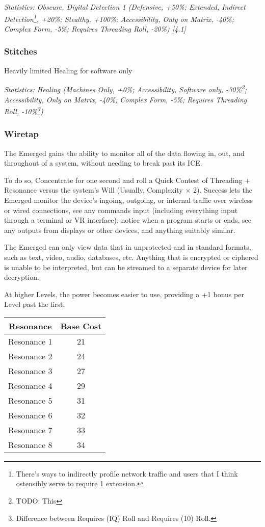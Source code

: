 \begin{multicols*}{3}
	\textcolor{OliveGreen}{\textit{Statistics: Obscure, Digital Detection 1 (Defensive, +50\%; Extended, Indirect Detection\footnote{There's ways to indirectly profile network traffic and users that I think ostensibly serve to require 1 extension.}, +20\%; Stealthy, +100\%; Accessibility, Only on Matrix, -40\%; Complex Form, -5\%; Requires Threading Roll, -20\%) [4.1]}}
	
	\subsubsection*{Stitches}\label{stitches}
	
	Heavily limited Healing for software only
	
	\textcolor{OliveGreen}{\textit{Statistics: Healing (Machines Only, +0\%; Accessibility, Software only, -30\%\footnote{TODO: This}; Accessibility, Only on Matrix, -40\%; Complex Form, -5\%; Requires Threading Roll, -10\%\footnote{Difference between Requires (IQ) Roll and Requires (10) Roll.}) }}
	
	\subsubsection*{Wiretap}\label{wiretap}
	
	The Emerged gains the ability to monitor all of the data flowing in, out, and throughout of a system, without needing to break past its ICE.
	
	To do so, Concentrate for one second and roll a Quick Contest of Threading + Resonance versus the system's Will (Usually, Complexity $\times$ 2). Success lets the Emerged monitor the device's ingoing, outgoing, or internal traffic over wireless or wired connections, see any commands input (including everything input through a terminal or VR interface), notice when a program starts or ends, see any outputs from displays or other devices, and anything suitably similar. 
	
	The Emerged can only view data that in unprotected and in standard formats, such as text, video, audio, databases, etc. Anything that is encrypted or ciphered is unable to be interpreted, but can be streamed to a separate device for later decryption.
	
	At higher Levels, the power becomes easier to use, providing a +1 bonus per Level past the first.
	
	\begin{center}
		\begin{tabular}{|c|c|}
			\hline
			Resonance & Base Cost\\
			\hline
			\hline
			Resonance 1 & 21 \\
			Resonance 2 & 24 \\
			Resonance 3 & 27 \\
			Resonance 4 & 29 \\
			Resonance 5 & 31 \\
			Resonance 6 & 32 \\
			Resonance 7 & 33 \\
			Resonance 8 & 34 \\
			\hline
		\end{tabular}
	\end{center}	
	

\end{multicols*}
